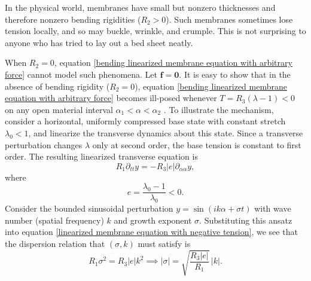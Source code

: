 \documentclass{article}[12pt]
\theoremstyle{Theorem}
\begin{document}
In the physical world, membranes have small but nonzero thicknesses and therefore nonzero bending rigidities ($R_2 > 0$). Such membranes sometimes lose tension locally, and so may buckle, wrinkle, and crumple. This is not surprising to anyone who has tried to lay out a bed sheet neatly.
\newline

When $R_2 = 0$, equation \eqref{bending linearized membrane equation with arbitrary force} cannot model such phenomena. Let $\boldsymbol{f} = \boldsymbol{0}$. It is easy to show that in the absence of bending rigidity ($R_2 = 0$), equation \eqref{bending linearized membrane equation with arbitrary force} becomes ill-posed whenever $T = R_3(\lambda - 1) < 0$ on any open material interval $\alpha_1 < \alpha < \alpha_2$ \cite{triantafyllou1994dynamic}. To illustrate the mechanism, consider a horizontal, uniformly compressed base state with constant stretch $\lambda_0<1$, and linearize the transverse dynamics about this state. Since a transverse perturbation changes $\lambda$ only at second order, the base tension is constant to first order. The resulting linearized transverse equation is
\begin{equation}
R_1\partial_{tt}y = -R_3|e|\partial_{\alpha\alpha}y,
\label{linearized membrane equation with negative tension}
\end{equation}
where
\[
e=\frac{\lambda_0-1}{\lambda_0}<0.
\]
Consider the bounded sinusoidal perturbation $y = \sin({ik\alpha + \sigma t})$ with wave number (spatial frequency) $k$ and growth exponent $\sigma$. Substituting this ansatz into equation \eqref{linearized membrane equation with negative tension}, we see that the dispersion relation that $(\sigma,k)$ must satisfy is
\begin{equation}
R_1\sigma^2 = R_3|e|k^2
\implies
|\sigma| = \sqrt{\frac{R_3|e|}{R_1}}\,|k|.
\end{equation}
\end{document}
